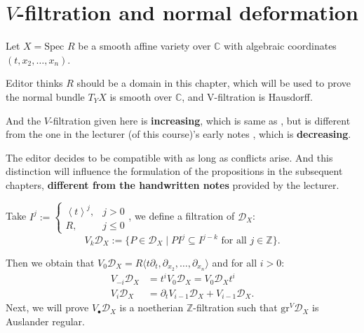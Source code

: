 \section{$V$-filtration and normal deformation}
Let $X = \text{Spec } R$ be a smooth affine variety over $\mathbb{C}$ with algebraic coordinates $(t, x_2, \ldots, x_n)$.

\begin{remark}\label{rmk:increasing_V_filtration}
    Editor thinks $R$ should be a domain in this chapter, which will be used to prove the normal bundle $T_Y X$ is smooth over $\mathbb{C}$, and V-filtration is Hausdorff.

    And the $V$-filtration given here is \textbf{increasing},
    which is same as \cite[2.10.7 The $V$-filtration on $\mathcal{D}_X$.]{Bjork1993AnalyticDModules},
    but is different from the one in the lecturer (of this course)'s early notes \cite[Definition~2.1]{Wu2017NearbyVanishingCycles}, which is \textbf{decreasing}.

    The editor decides to be compatible with \cite{Bjork1993AnalyticDModules} as long as conflicts arise. And this distinction will influence the formulation of the propositions in the subsequent chapters, \textbf{different from the handwritten notes} provided by the lecturer.
\end{remark}

\label{def:definition_of_V_filtration}
Take $I^j :=\begin{cases}\left< t \right>^{j},& j > 0\\R,&j\leq0\end{cases}$,
we define a filtration of $\mathcal{D}_{X}$:
$$
    V_{k} \mathcal{D}_X := \{P \in \mathcal{D}_X \mid P I^{j} \subseteq I^{j-k}\text{ for all }j\in \mathbb{Z}\}.
$$

Then we obtain that $V_0 \mathcal{D}_X = R \langle t\partial_t, \partial_{x_2}, \ldots, \partial_{x_n} \rangle$ and for all $i>0$:
\begin{align*}
    V_{-i} \mathcal{D}_{X} & = t^{i} V_{0 }\mathcal{D}_{X } = V_{0} \mathcal{D}_{X} t^{i} \\
    V_i \mathcal{D}_X      & = \partial_t V_{i-1} \mathcal{D}_X + V_{i-1} \mathcal{D}_X.
\end{align*}
Next, we will prove $V_{\bullet} \mathcal{D}_X$ is a noetherian $\mathbb{Z}$-filtration such that $\mathrm{gr}^V \mathcal{D}_X$ is Auslander regular.

